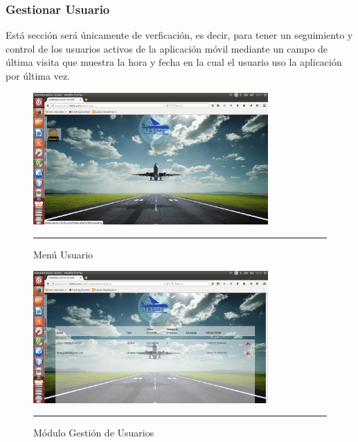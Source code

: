 \subsubsection{Gestionar Usuario}
Está sección será únicamente de verficación, es decir, para tener un seguimiento y control de los usuarios activos de la aplicación móvil 
mediante un campo de última visita que muestra la hora y fecha en la cual el usuario uso la aplicación por última vez.
\begin{figure}[h!]
	\centering
		\includegraphics[width=0.8\textwidth]{Figuras/indexUsuario.png}
		\rule{35em}{0.5pt}
	\caption[Menú Usuario]{Menú Usuario}
	\label{fig:menuUsuario}
\end{figure}
\begin{figure}[h!]
	\centering
		\includegraphics[width=0.8\textwidth]{Figuras/usuarios.png}
		\rule{35em}{0.5pt}
	\caption[Módulo Gestión de Usuarios]{Módulo Gestión de Usuarios}
	\label{fig:moduloUsuarios}
\end{figure}
\clearpage

